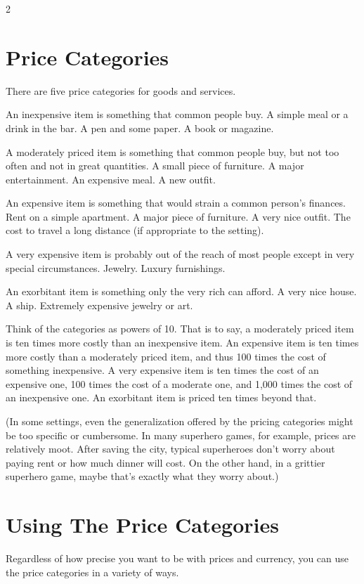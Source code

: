 \begin{multicols}{2}
\section{Price Categories}

There are five price categories for goods and services.

An inexpensive item is something that common people buy. A simple meal or a drink in the bar. A pen and some paper. A book or magazine. 

A moderately priced item is something that common people buy, but not too often and not in great quantities. A small piece of furniture. A major entertainment. An expensive meal. A new outfit.

An expensive item is something that would strain a common person’s finances. Rent on a simple apartment. A major piece of furniture. A very nice outfit. The cost to travel a long distance (if appropriate to the setting).

A very expensive item is probably out of the reach of most people except in very special circumstances. Jewelry. Luxury furnishings. 

An exorbitant item is something only the very rich can afford. A very nice house. A ship. Extremely expensive jewelry or art.

Think of the categories as powers of 10. That is to say, a moderately priced item is ten times more costly than an inexpensive item. An expensive item is ten times more costly than a moderately priced item, and thus 100 times the cost of something inexpensive. A very expensive item is ten times the cost of an expensive one, 100 times the cost of a moderate one, and 1,000 times the cost of an inexpensive one. An exorbitant item is priced ten times beyond that.

(In some settings, even the generalization offered by the pricing categories might be too specific or cumbersome. In many superhero games, for example, prices are relatively moot. After saving the city, typical superheroes don’t worry about paying rent or how much dinner will cost. On the other hand, in a grittier superhero game, maybe that’s exactly what they worry about.)

\section{Using The Price Categories}

Regardless of how precise you want to be with prices and currency, you can use the price categories in a variety of ways.


\end{multicols}
